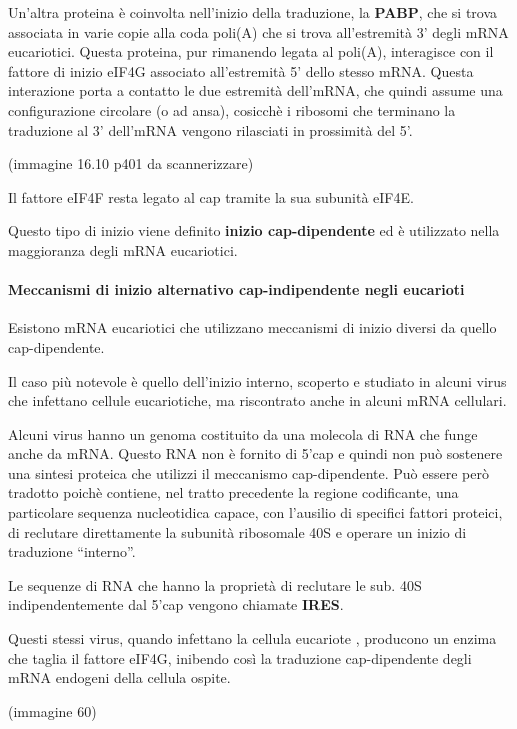 \documentclass[]{article}
\begin{document}
Un'altra proteina è coinvolta nell'inizio della traduzione, la
\textbf{PABP}, che si trova associata in varie copie alla coda poli(A)
che si trova all'estremità 3' degli mRNA eucariotici. Questa proteina,
pur rimanendo legata al poli(A), interagisce con il fattore di inizio
eIF4G associato all'estremità 5' dello stesso mRNA. Questa interazione
porta a contatto le due estremità dell'mRNA, che quindi assume una
configurazione circolare (o ad ansa), cosicchè i ribosomi che terminano
la traduzione al 3' dell'mRNA vengono rilasciati in prossimità del 5'.

(immagine 16.10 p401 da scannerizzare)

Il fattore eIF4F resta legato al cap tramite la sua subunità eIF4E.

Questo tipo di inizio viene definito \textbf{inizio cap-dipendente} ed è
utilizzato nella maggioranza degli mRNA eucariotici.

\paragraph{Meccanismi di inizio alternativo cap-indipendente negli
eucarioti}\label{meccanismi-di-inizio-alternativo-cap-indipendente-negli-eucarioti}

Esistono mRNA eucariotici che utilizzano meccanismi di inizio diversi da
quello cap-dipendente.

Il caso più notevole è quello dell'inizio interno, scoperto e studiato
in alcuni virus che infettano cellule eucariotiche, ma riscontrato anche
in alcuni mRNA cellulari.

Alcuni virus hanno un genoma costituito da una molecola di RNA che funge
anche da mRNA. Questo RNA non è fornito di 5'cap e quindi non può
sostenere una sintesi proteica che utilizzi il meccanismo
cap-dipendente. Può essere però tradotto poichè contiene, nel tratto
precedente la regione codificante, una particolare sequenza nucleotidica
capace, con l'ausilio di specifici fattori proteici, di reclutare
direttamente la subunità ribosomale 40S e operare un inizio di
traduzione ``interno''.

Le sequenze di RNA che hanno la proprietà di reclutare le sub. 40S
indipendentemente dal 5'cap vengono chiamate \textbf{IRES}.

Questi stessi virus, quando infettano la cellula eucariote , producono
un enzima che taglia il fattore eIF4G, inibendo così la traduzione
cap-dipendente degli mRNA endogeni della cellula ospite.

(immagine 60)
\end{document}
